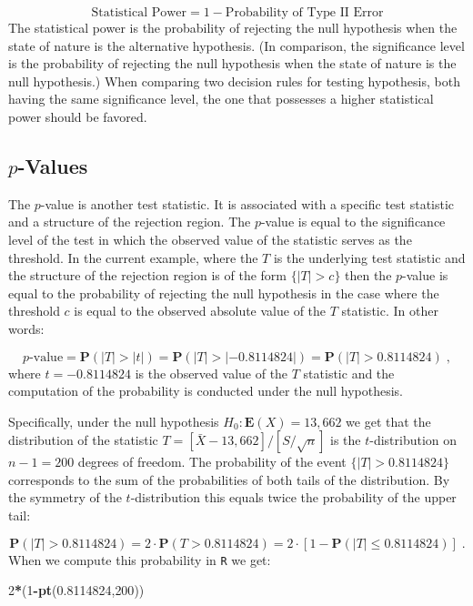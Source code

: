 \documentclass[
]{krantz}
\makeatletter
\newenvironment{Shaded}{\begin{snugshade}}{\end{snugshade}}
\newcommand{\DecValTok}[1]{\textcolor[rgb]{0.00,0.00,0.81}{#1}}
\newcommand{\FloatTok}[1]{\textcolor[rgb]{0.00,0.00,0.81}{#1}}
\newcommand{\KeywordTok}[1]{\textcolor[rgb]{0.13,0.29,0.53}{\textbf{#1}}}
\newcommand{\NormalTok}[1]{#1}
\newcommand{\OperatorTok}[1]{\textcolor[rgb]{0.81,0.36,0.00}{\textbf{#1}}}
\newcommand{\Expec}{\mathbf{E}}
\newcommand{\Prob}{\mathbf{P}}
\newenvironment{kframe}{%
\medskip{}
\setlength{\fboxsep}{.8em}
 \def\at@end@of@kframe{}%
 \ifinner\ifhmode%
  \def\at@end@of@kframe{\end{minipage}}%
  \begin{minipage}{\columnwidth}%
 \fi\fi%
 \def\FrameCommand##1{\hskip\@totalleftmargin \hskip-\fboxsep
 \colorbox{shadecolor}{##1}\hskip-\fboxsep
     \hskip-\linewidth \hskip-\@totalleftmargin \hskip\columnwidth}%
 \MakeFramed {\advance\hsize-\width
   \@totalleftmargin\z@ \linewidth\hsize
   \@setminipage}}%
 {\par\unskip\endMakeFramed%
 \at@end@of@kframe}
\renewenvironment{Shaded}{\begin{kframe}}{\end{kframe}}
\theoremstyle{definition}
\theoremstyle{definition}
\theoremstyle{definition}
\theoremstyle{remark}
\makeatother
\begin{document}
\[\mbox{Statistical Power} = 1 - \mbox{Probability of Type II Error}\]
The statistical power is the probability of rejecting the null
hypothesis when the state of nature is the alternative hypothesis. (In
comparison, the significance level is the probability of rejecting the
null hypothesis when the state of nature is the null hypothesis.) When
comparing two decision rules for testing hypothesis, both having the
same significance level, the one that possesses a higher statistical
power should be favored.

\hypertarget{p-values}{%
\subsection{\texorpdfstring{\(p\)-Values}{p-Values}}\label{p-values}}

The \(p\)-value is another test statistic. It is associated with a
specific test statistic and a structure of the rejection region. The
\(p\)-value is equal to the significance level of the test in which the
observed value of the statistic serves as the threshold. In the current
example, where the \(T\) is the underlying test statistic and the
structure of the rejection region is of the form \(\{|T| > c\}\) then the
\(p\)-value is equal to the probability of rejecting the null hypothesis
in the case where the threshold \(c\) is equal to the observed absolute
value of the \(T\) statistic. In other words:

\[\mbox{$p$-value} = \Prob(|T| > |t|) = \Prob(|T| > |-0.8114824|)= \Prob(|T| > 0.8114824)\;,\]
where \(t=-0.8114824\) is the observed value of the \(T\) statistic and the
computation of the probability is conducted under the null hypothesis.

Specifically, under the null hypothesis \(H_0: \Expec(X) = 13,662\) we get
that the distribution of the statistic
\(T = [\bar X - 13,662]/[S/\sqrt{n}]\) is the \(t\)-distribution on
\(n-1 = 200\) degrees of freedom. The probability of the event
\(\{|T| > 0.8114824\}\) corresponds to the sum of the probabilities of
both tails of the distribution. By the symmetry of the \(t\)-distribution
this equals twice the probability of the upper tail:

\[\Prob(|T| > 0.8114824) = 2\cdot \Prob(T> 0.8114824) = 2\cdot [1-\Prob(|T| \leq 0.8114824)]\;.\]
When we compute this probability in \texttt{R} we get:

\begin{Shaded}
\begin{Highlighting}[]
\DecValTok{2}\OperatorTok{*}\NormalTok{(}\DecValTok{1}\OperatorTok{-}\KeywordTok{pt}\NormalTok{(}\FloatTok{0.8114824}\NormalTok{,}\DecValTok{200}\NormalTok{))}
\end{Highlighting}
\end{Shaded}
\end{document}

